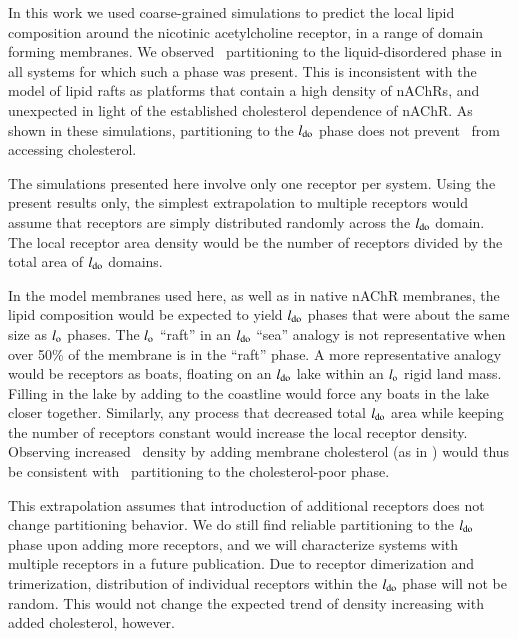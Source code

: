 
In this work we used coarse-grained simulations to predict the local lipid composition around the nicotinic acetylcholine receptor, in a range of domain forming membranes.  We observed  \nachr~partitioning to the liquid-disordered phase in all systems for which such a phase was present.  This is inconsistent with the model of lipid rafts as platforms that contain a high density of nAChRs, and unexpected in light of the established cholesterol dependence of nAChR.  As shown in these simulations, partitioning to the $l_{\mathrm{do}}$ phase does not prevent \nachr~from accessing cholesterol. 

The simulations presented here involve only one receptor per system.  Using the present results only, the simplest extrapolation to multiple receptors would assume that receptors are simply distributed randomly across the $l_{\mathrm{do}}$ domain.  The local receptor area density would be the number of receptors divided by the total area of $l_{\mathrm{do}}$ domains.    

In the model membranes used here, as well as in native nAChR membranes, the lipid composition would be expected to yield $l_{\mathrm{do}}$ phases that were about the same size as $l_{\mathrm{o}}$ phases. The $l_{\mathrm{o}}$ ``raft'' in an $l_{\mathrm{do}}$ ``sea'' analogy is not representative when over 50\% of the membrane is in the ``raft'' phase.  A more representative analogy would be receptors as boats, floating on an $l_{\mathrm{do}}$ lake within an $l_{\mathrm{o}}$ rigid land mass.  Filling in the lake by adding to the coastline would force any boats in the lake closer together.  Similarly, any process that decreased total $l_{\mathrm{do}}$ area while keeping the number of receptors constant would increase the local receptor density.   Observing increased \nachr~density by adding membrane cholesterol (as in \cite{%
Barrantes2014,Rodrigues2013,Bruses2001,Marchand2002,Oshikawa2003,Pato2008,Zhu2006, Barrantes2007,%
Barrantes2010,Wenz2005,Borroni2016}) would thus be consistent with \nachr~partitioning to the cholesterol-poor phase. 

This extrapolation assumes that introduction of additional receptors does not change partitioning behavior.  We do still find reliable partitioning to the $l_{\mathrm{do}}$ phase upon adding more receptors, and we will characterize systems with multiple receptors in a future publication. Due to receptor dimerization and trimerization, distribution of individual receptors within the $l_{\mathrm{do}}$ phase will not be random.   This would not change the expected trend of density increasing with added cholesterol, however.  

